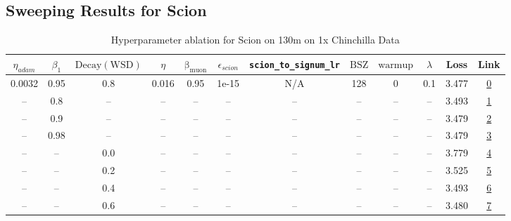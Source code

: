 \subsection{Sweeping Results for Scion}%
\begin{table}[H]
\centering
\caption{Hyperparameter ablation for Scion on 130m on 1x Chinchilla Data}
\label{tab:ablation_scion_130m_1}
\begin{tabular}{cccccccccccc}
\toprule
$\eta_{adam}$ & $\beta_1$ & $\mathrm{Decay (WSD)}$ & $\eta$ & $\mathrm{\beta_{muon}}$ & $\epsilon_{scion}$ & \texttt{scion\_to\_signum\_lr} & $\mathrm{BSZ}$ & $\mathrm{warmup}$ & $\lambda$ & Loss & Link \\
\midrule
0.0032 & 0.95 & 0.8 & 0.016 & 0.95 & 1e-15 & N/A & 128 & 0 & 0.1 & 3.477 & \href{https://wandb.ai/stanford-mercury/optimizer-scaling/runs/sweep-130m-2B-scion88e825lr0.016-wd0.1-minlr0-warmup0-b10.95-gn1-09a932}{0} \\
\midrule
-- & 0.8 & -- & -- & -- & -- & -- & -- & -- & -- & 3.493 & \href{https://wandb.ai/stanford-mercury/optimizer-scaling/runs/sweep-130m-2B-scion76ae21lr0.016-wd0.1-minlr0-warmup0-b10.8-gn1--382a96}{1} \\
-- & 0.9 & -- & -- & -- & -- & -- & -- & -- & -- & 3.479 & \href{https://wandb.ai/stanford-mercury/optimizer-scaling/runs/sweep-130m-2B-scione9cd68lr0.016-wd0.1-minlr0-warmup0-b10.9-gn1--16327d}{2} \\
-- & 0.98 & -- & -- & -- & -- & -- & -- & -- & -- & 3.479 & \href{https://wandb.ai/stanford-mercury/optimizer-scaling/runs/sweep-130m-2B-scion298bd3lr0.016-wd0.1-minlr0-warmup0-b10.98-gn1-ca3133}{3} \\
-- & -- & 0.0 & -- & -- & -- & -- & -- & -- & -- & 3.779 & \href{https://wandb.ai/stanford-mercury/optimizer-scaling/runs/sweep-130m-2B-scione7f648lr0.016-wd0.1-minlr0-warmup0-b10.95-gn1-c67748}{4} \\
-- & -- & 0.2 & -- & -- & -- & -- & -- & -- & -- & 3.525 & \href{https://wandb.ai/stanford-mercury/optimizer-scaling/runs/sweep-130m-2B-scion1a724elr0.016-wd0.1-minlr0-warmup0-b10.95-gn1-32726f}{5} \\
-- & -- & 0.4 & -- & -- & -- & -- & -- & -- & -- & 3.493 & \href{https://wandb.ai/stanford-mercury/optimizer-scaling/runs/sweep-130m-2B-sciona3bd94lr0.016-wd0.1-minlr0-warmup0-b10.95-gn1-47edd4}{6} \\
-- & -- & 0.6 & -- & -- & -- & -- & -- & -- & -- & 3.480 & \href{https://wandb.ai/stanford-mercury/optimizer-scaling/runs/sweep-130m-2B-scion4f23ealr0.016-wd0.1-minlr0-warmup0-b10.95-gn1-ec1bf5}{7} \\

\end{tabular}
\end{table}
